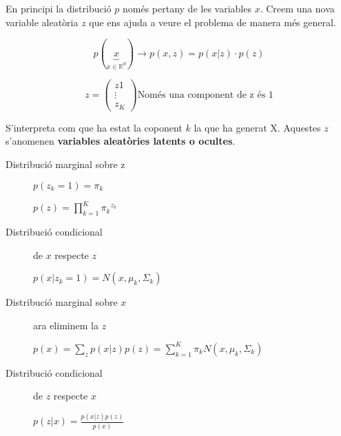 \documentclass[a4paper]{article}
\begin{document}
En principi la distribució $p$ només pertany de les variables $x$. Creem una nova variable aleatòria $z$ que ens ajuda a veure el problema de manera més general.

$$ p(\underbrace{x}_{x \in \mathbb{R}^d}) \rightarrow p(x,z) = p(x|z)·p(z)$$

$$ z = \begin{pmatrix}
z1 \\ \vdots \\ z_K
\end{pmatrix} \text{Només una component de z és 1} $$

S'interpreta com que ha estat la coponent $k$ la que ha generat X. Aquestes $z$ s'anomenen \textbf{variables aleatòries latents o ocultes}.

\begin{description}
	\item[Distribució marginal sobre z] $p(z_k = 1) = \pi_k$
	
	$p(z) = \prod_{k=1}^K {\pi_k}^{z_k}$
	
	\item[Distribució condicional] de $x$ respecte $z$
	
	$p(x|z_k = 1) = N(x, \mu_k, \Sigma_k)$
	
	\item[Distribució marginal sobre $x$] ara eliminem la $z$
	
	$p(x) = \sum_z p(x|z)p(z) = \sum_{k=1}^K \pi_k N(x, \mu_k, \Sigma_k)$
	
	\item[Distribució condicional] de $z$ respecte $x$
	
	$p(z|x) = \frac{p(x|z)p(z)}{p(x)}$
\end{description}
\end{document}
